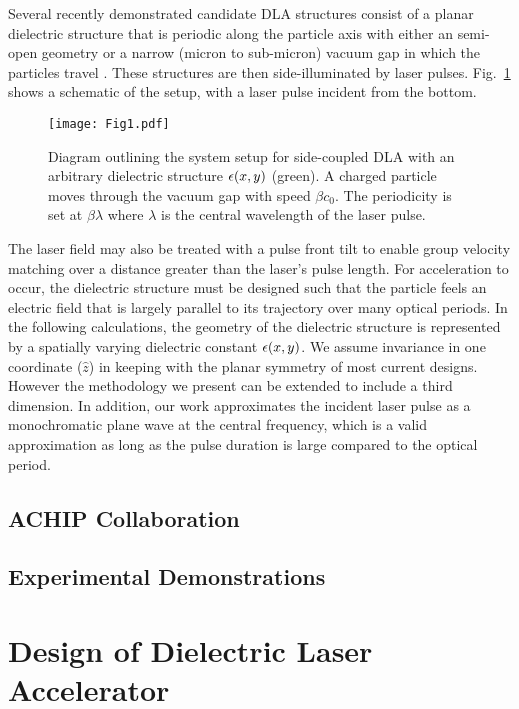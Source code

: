 Several recently demonstrated candidate DLA structures consist of a planar dielectric structure that is periodic along the particle axis with either an semi-open geometry or a narrow (micron to sub-micron) vacuum gap in which the particles travel \cite{plettner2006proposed, peralta2013demonstration, mcneur2016elements, leedle2015dielectric, chang2014silicon, breuer2014dielectric, breuer2014dielectric2, kozak2016dielectric}.
These structures are then side-illuminated by laser pulses. Fig.~\ref{fig:system} shows a schematic of the setup, with a laser pulse incident from the bottom.

\begin{figure}[htb!]
\centering\texttt{[image: Fig1.pdf]}
\caption{Diagram outlining the system setup for side-coupled DLA with an arbitrary dielectric structure $\epsilon(x,y)$ (green).  A charged particle moves through the vacuum gap with speed $\beta c_0$.  The periodicity is set at $\beta \lambda$ where $\lambda$ is the central wavelength of the laser pulse.}
\label{fig:system}
\end{figure}

The laser field may also be treated with a pulse front tilt \cite{hebling1996derivation, akturk2004pulse} to enable group velocity matching over a distance greater than the laser's pulse length.
For acceleration to occur, the dielectric structure must be designed such that the particle feels an electric field that is largely parallel to its trajectory over many optical periods.
In the following calculations, the geometry of the dielectric structure is represented by a spatially varying dielectric constant $\epsilon(x,y)$.  We assume invariance in one coordinate ($\hat{z}$) in keeping with the planar symmetry of most current designs.
However the methodology we present can be extended to include a third dimension.
In addition, our work approximates the incident laser pulse as a monochromatic plane wave at the central frequency, which is a valid approximation as long as the pulse duration is large compared to the optical period.

\subsection{ACHIP Collaboration}
\subsection{Experimental Demonstrations}

\section{Design of Dielectric Laser Accelerator}

